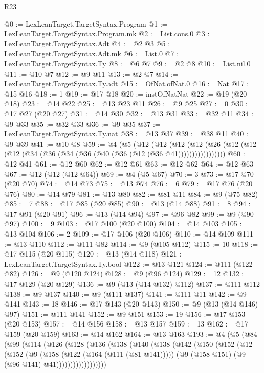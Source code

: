 \begin{lexlean}{R23}
\begin{coremodule}
@0 := LexLeanTarget.TargetSyntax.Program
@1 := LexLeanTarget.TargetSyntax.Program.mk
@2 := List.cons.{0}
@3 := LexLeanTarget.TargetSyntax.Adt
@4 := @2 @3
@5 := LexLeanTarget.TargetSyntax.Adt.mk
@6 := List.{0}
@7 := LexLeanTarget.TargetSyntax.Ty
@8 := @6 @7
@9 := @2 @8
@10 := List.nil.{0}
@11 := @10 @7
@12 := @9 @11
@13 := @2 @7
@14 := LexLeanTarget.TargetSyntax.Ty.adt
@15 := OfNat.ofNat.{0}
@16 := Nat
@17 := @15 @16
@18 := 1
@19 := @17 @18
@20 := instOfNatNat
@22 := @19 (@20 @18)
@23 := @14 @22
@25 := @13 @23 @11
@26 := @9 @25
@27 := 0
@30 := @17 @27 (@20 @27)
@31 := @14 @30
@32 := @13 @31
@33 := @32 @11
@34 := @9 @33
@35 := @32 @33
@36 := @9 @35
@37 := LexLeanTarget.TargetSyntax.Ty.nat
@38 := @13 @37
@39 := @38 @11
@40 := @9 @39
@41 := @10 @8
@59 := @4
    (@5
      (@12
        (@12
          (@12 (@12 (@26 (@12 (@12 (@12 (@34 (@36 (@34 (@36 (@40 (@36 (@12 (@36 @41)))))))))))))))))
@60 := @12 @41
@61 := @12 @60
@62 := @12 @61
@63 := @12 @62
@64 := @12 @63
@67 := @12 (@12 (@12 @64))
@69 := @4 (@5 @67)
@70 := 3
@73 := @17 @70 (@20 @70)
@74 := @14 @73
@75 := @13 @74
@76 := 6
@79 := @17 @76 (@20 @76)
@80 := @14 @79
@81 := @13 @80
@82 := @81 @11
@84 := @9 (@75 @82)
@85 := 7
@88 := @17 @85 (@20 @85)
@90 := @13 (@14 @88)
@91 := 8
@94 := @17 @91 (@20 @91)
@96 := @13 (@14 @94)
@97 := @96 @82
@99 := @9 (@90 @97)
@100 := 9
@103 := @17 @100 (@20 @100)
@104 := @14 @103
@105 := @13 @104
@106 := 2
@109 := @17 @106 (@20 @106)
@110 := @14 @109
@111 := @13 @110
@112 := @111 @82
@114 := @9 (@105 @112)
@115 := 10
@118 := @17 @115 (@20 @115)
@120 := @13 (@14 @118)
@121 := LexLeanTarget.TargetSyntax.Ty.bool
@122 := @13 @121
@124 := @111 (@122 @82)
@126 := @9 (@120 @124)
@128 := @9 (@96 @124)
@129 := 12
@132 := @17 @129 (@20 @129)
@136 := @9 (@13 (@14 @132) @112)
@137 := @111 @112
@138 := @9 @137
@140 := @9 (@111 @137)
@141 := @111 @11
@142 := @9 @141
@143 := 18
@146 := @17 @143 (@20 @143)
@150 := @9 (@13 (@14 @146) @97)
@151 := @111 @141
@152 := @9 @151
@153 := 19
@156 := @17 @153 (@20 @153)
@157 := @14 @156
@158 := @13 @157
@159 := 13
@162 := @17 @159 (@20 @159)
@163 := @14 @162
@164 := @13 @163
@193 := @4
    (@5
      (@84
        (@99
          (@114
            (@126
              (@128
                (@136
                  (@138
                    (@140
                      (@138
                        (@142
                          (@150
                            (@152
                              (@12
                                (@152
                                  (@9
                                    (@158 (@122 (@164 (@111 (@81 @141)))))
                                    (@9 (@158 @151) (@9 (@96 @141) @41))))))))))))))))))

\end{coremodule}
\end{lexlean}
